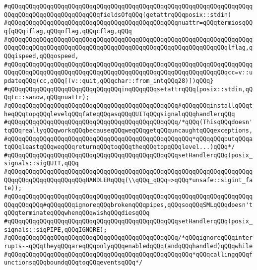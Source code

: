\verb|#qQQqqQQqqQQqqQQqqQQqqQQqqQQqqQQqqQQqqQQqqQQqqQQqqQQqqQQqqQQqqQQqqQQqqQQqqQQqqQQqqQQqqQQqqQQqqQQqfieldsOfqQQq(getattrqQQqposix::stdin)|\newline
\verb|#qQQqqQQqqQQqqQQqqQQqqQQqqQQqqQQqqQQqqQQqqQQqqQQqnuattr=qQQqtermiosqQQq{qQQqiflag,qQQqoflag,qQQqcflag,qQQq|\newline
\verb|#qQQqqQQqqQQqqQQqqQQqqQQqqQQqqQQqqQQqqQQqqQQqqQQqqQQqqQQqqQQqqQQqqQQqqQQqqQQqqQQqqQQqqQQqqQQqqQQqqQQqqQQqqQQqqQQqqQQqqQQqqQQqqQQqqQQqlflag,qQQqispeed,qQQqospeed,|\newline
\verb|#qQQqqQQqqQQqqQQqqQQqqQQqqQQqqQQqqQQqqQQqqQQqqQQqqQQqqQQqqQQqqQQqqQQqqQQqqQQqqQQqqQQqqQQqqQQqqQQqqQQqqQQqqQQqqQQqqQQqqQQqqQQqqQQqqQQqcc=v::updateqQQq(cc,qQQq[(v::quit,qQQqchar::from_intqQQq28)])qQQq}|\newline
\verb|#qQQqqQQqqQQqqQQqqQQqqQQqqQQqqQQqinqQQqqQQqsetattrqQQq(posix::stdin,qQQqtc::sanow,qQQqnuattr);|\newline
\verb|#qQQqqQQqqQQqqQQqqQQqqQQqqQQqqQQqqQQqqQQqqQQqqQQq#qQQqqQQqinstallqQQqtheqQQqtopqQQqlevelqQQqfateqQQqasqQQqQUITqQQqsignalqQQqhandlerqQQq|\newline
\verb|#qQQqqQQqqQQqqQQqqQQqqQQqqQQqqQQqqQQqqQQqqQQqqQQq/*qQQq(ThisqQQqdoesn'tqQQqreallyqQQqworkqQQqbecauseqQQqweqQQqgetqQQquncaughtqQQqexceptions,|\newline
\verb|#qQQqqQQqqQQqqQQqqQQqqQQqqQQqqQQqqQQqqQQqqQQqqQQqqQQq*qQQqqQQqbutqQQqatqQQqleastqQQqweqQQqreturnqQQqtoqQQqtheqQQqtopqQQqlevel...)qQQq*/|\newline
\verb|#qQQqqQQqqQQqqQQqqQQqqQQqqQQqqQQqqQQqqQQqqQQqqQQqsetHandlerqQQq(posix_signals::sigQUIT,qQQq|\newline
\verb|#qQQqqQQqqQQqqQQqqQQqqQQqqQQqqQQqqQQqqQQqqQQqqQQqqQQqqQQqqQQqqQQqqQQqqQQqqQQqqQQqqQQqqQQqqQQqHANDLERqQQq(\\qQQq_qQQq=>qQQq*unsafe::sigint_fate));|\newline
\verb|#qQQqqQQqqQQqqQQqqQQqqQQqqQQqqQQqqQQqqQQqqQQqqQQqqQQqqQQqqQQqqQQqqQQqqQQqqQQqqQQq#qQQqqQQqignoreqQQqbrokenqQQqpipes,qQQqsoqQQqSMLqQQqdoesn'tqQQqterminateqQQqwhenqQQqwishqQQqdiesqQQq|\newline
\verb|#qQQqqQQqqQQqqQQqqQQqqQQqqQQqqQQqqQQqqQQqqQQqqQQqsetHandlerqQQq(posix_signals::sigPIPE,qQQqIGNORE);|\newline
\verb|#qQQqqQQqqQQqqQQqqQQqqQQqqQQqqQQqqQQqqQQqqQQqqQQq/*qQQqignoreqQQqinterrupts--qQQqtheyqQQqareqQQqonlyqQQqenabledqQQq(andqQQqhandled)qQQqwhile|\newline
\verb|#qQQqqQQqqQQqqQQqqQQqqQQqqQQqqQQqqQQqqQQqqQQqqQQqqQQq*qQQqcallingqQQqfunctionsqQQqboundqQQqtoqQQqeventsqQQq*/|\newline
